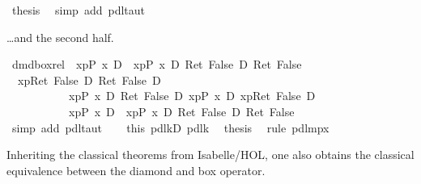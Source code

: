 \begin{isabellebody}
\ {\isacharquery}thesis\ \isamarkupfalse%
\ {\isacharparenleft}simp\ add{\isacharcolon}\ pdl{\isacharunderscore}taut{\isacharparenright}\isanewline
\isamarkupfalse%
\isamarkupfalse%
%
\begin{isamarkuptext}%
\dots and the second half.%
\end{isamarkuptext}%
\isamarkuptrue%
\ dmd{\isacharunderscore}box{\isacharunderscore}rel{}{\isacharcolon}\ {\isachardoublequote}{\isasymturnstile}\ {\isasymlangle}x{\isasymleftarrow}p{\isasymrangle}{\isacharparenleft}P\ x{\isacharparenright}\ {\isasymlongrightarrow}\isactrlsub D\ {\isacharbrackleft}{\isacharhash}\ x{\isasymleftarrow}p{\isacharbrackright}{\isacharparenleft}P\ x\ {\isasymlongrightarrow}\isactrlsub D\ Ret\ False{\isacharparenright}\ {\isasymlongrightarrow}\isactrlsub D\ Ret\ False{\isachardoublequote}\isanewline
\isamarkupfalse%
\ {\isacharminus}\isanewline
\ \ \isamarkupfalse%
\ {\isachardoublequote}{\isasymturnstile}\ {\isacharparenleft}{\isasymlangle}x{\isasymleftarrow}p{\isasymrangle}{\isacharparenleft}Ret\ False{\isacharparenright}\ {\isasymlongrightarrow}\isactrlsub D\ Ret\ False{\isacharparenright}\ {\isasymlongrightarrow}\isactrlsub D\ \isanewline
\ \ \ \ \ \ \ \ \ \ {\isacharparenleft}{\isacharbrackleft}{\isacharhash}\ x{\isasymleftarrow}p{\isacharbrackright}{\isacharparenleft}P\ x\ {\isasymlongrightarrow}\isactrlsub D\ Ret\ False{\isacharparenright}\ {\isasymlongrightarrow}\isactrlsub D\ {\isasymlangle}x{\isasymleftarrow}p{\isasymrangle}{\isacharparenleft}P\ x{\isacharparenright}\ {\isasymlongrightarrow}\isactrlsub D\ {\isasymlangle}x{\isasymleftarrow}p{\isasymrangle}{\isacharparenleft}Ret\ False{\isacharparenright}{\isacharparenright}\ {\isasymlongrightarrow}\isactrlsub D\ \ \isanewline
\ \ \ \ \ \ \ \ \ \ \ {\isasymlangle}x{\isasymleftarrow}p{\isasymrangle}{\isacharparenleft}P\ x{\isacharparenright}\ {\isasymlongrightarrow}\isactrlsub D\ {\isacharbrackleft}{\isacharhash}\ x{\isasymleftarrow}p{\isacharbrackright}{\isacharparenleft}P\ x\ {\isasymlongrightarrow}\isactrlsub D\ Ret\ False{\isacharparenright}\ {\isasymlongrightarrow}\isactrlsub D\ Ret\ False{\isachardoublequote}\isanewline
\ \ \ \ \isamarkupfalse%
\ {\isacharparenleft}simp\ add{\isacharcolon}\ pdl{\isacharunderscore}taut{\isacharparenright}\isanewline
\ \ \isamarkupfalse%
\ this\ pdl{\isacharunderscore}k{}D\ pdl{\isacharunderscore}k{}\ \isamarkupfalse%
\ {\isacharquery}thesis\ \isamarkupfalse%
\ {\isacharparenleft}rule\ pdl{\isacharunderscore}mp{\isacharunderscore}{}x{\isacharparenright}\isanewline
\isamarkupfalse%
\isamarkupfalse%
%
\begin{isamarkuptext}%
Inheriting the classical theorems from Isabelle/HOL, one also obtains the classical equivalence
  between the diamond and box operator.


\end{isamarkuptext}
\end{isabellebody}
